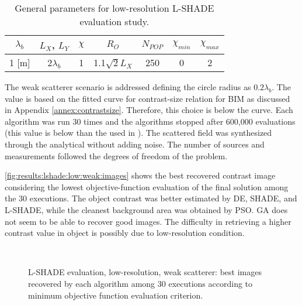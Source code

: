 			\begin{table}
				\centering
				\def\arraystretch{1.5}
				\caption{General parameters for low-resolution L-SHADE evaluation study.}
				\begin{tabular}{ccccccc}
					$\lambda_b$ & $L_X$, $L_Y$ & $\chi$ & $R_O$ & $N_{POP}$ & $\chi_{min}$ & $\chi_{max}$ \\\hline
					 1 [m] & 2$\lambda_b$ & 1 & 1.1$\sqrt{2}L_X$ & 250 & 0 & 2
				\end{tabular}
				\label{tab:results:lshade:low}
			\end{table}
		
			The weak scatterer scenario is addressed defining the circle radius as $0.2\lambda_b$. The value is based on the fitted curve for contrast-size relation for BIM as discussed in Appendix \ref{annex:contrastsize}. Therefore, this choice is below the curve. Each algorithm was run 30 times and the algorithms stopped after 600,000 evaluations (this value is below than the used in \citep{salucci2017multifrequency}). The scattered field was synthesized through the analytical without adding noise. The number of sources and measurements followed the degrees of freedom of the problem.
			
			\autoref{fig:results:lshade:low:weak:images} shows the best recovered contrast image considering the lowest objective-function evaluation of the final solution among the 30 executions. The object contrast was better estimated by DE, SHADE, and L-SHADE, while the cleanest background area was obtained by PSO. GA does not seem to be able to recover good images. The difficulty in retrieving a higher contrast value in object is possibly due to low-resolution condition.
			
			\begin{figure}
				\centering
				 \\
				\caption[L-SHADE evaluation, low-resolution, weak scatterer: best recovered images.]{L-SHADE evaluation, low-resolution, weak scatterer: best images recovered by each algorithm among 30 executions according to minimum objective function evaluation criterion.}
				\label{fig:results:lshade:low:weak:images}
			\end{figure}
		
